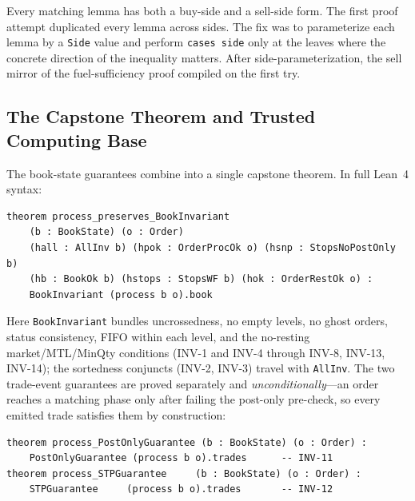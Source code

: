 \documentclass[11pt,a4paper]{article}
\begin{document}
Every matching lemma has both a buy-side and a sell-side form. The first
proof attempt duplicated every lemma across sides. The fix was to
parameterize each lemma by a \texttt{Side} value and perform
\texttt{cases side} only at the leaves where the concrete direction of
the inequality matters. After side-parameterization, the sell mirror of
the fuel-sufficiency proof compiled on the first try.

\subsection{The Capstone Theorem and Trusted Computing Base}
\label{sec:capstone-tcb}

The book-state guarantees combine into a single capstone theorem. In
full Lean~4 syntax:

\begin{lstlisting}[language={},basicstyle=\ttfamily\footnotesize]
theorem process_preserves_BookInvariant
    (b : BookState) (o : Order)
    (hall : AllInv b) (hpok : OrderProcOk o) (hsnp : StopsNoPostOnly b)
    (hb : BookOk b) (hstops : StopsWF b) (hok : OrderRestOk o) :
    BookInvariant (process b o).book
\end{lstlisting}

\noindent Here \texttt{BookInvariant} bundles uncrossedness, no empty
levels, no ghost orders, status consistency, FIFO within each level, and
the no-resting market/MTL/MinQty conditions (INV-1 and INV-4 through
INV-8, INV-13, INV-14); the sortedness conjuncts (INV-2, INV-3) travel
with \texttt{AllInv}. The two trade-event guarantees are proved
separately and \emph{unconditionally}---an order reaches a matching
phase only after failing the post-only pre-check, so every emitted trade
satisfies them by construction:

\begin{lstlisting}[language={},basicstyle=\ttfamily\footnotesize]
theorem process_PostOnlyGuarantee (b : BookState) (o : Order) :
    PostOnlyGuarantee (process b o).trades      -- INV-11
theorem process_STPGuarantee     (b : BookState) (o : Order) :
    STPGuarantee     (process b o).trades       -- INV-12
\end{lstlisting}
\end{document}
